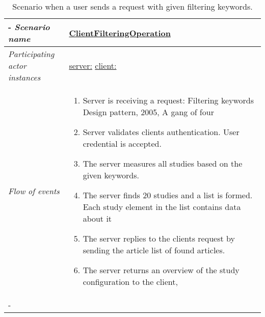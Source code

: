 %
%
\begin{table}[h!]
	\tabulinesep=1.5mm
	\begin{tabu} to 
		\tabucline[1.5pt]-
		\textit{Scenario name} & \underline{ClientFilteringOperation} \\
		\hline
		\textit{Participating actor 
		\newline instances} & \underline{server:\serverside}
		\newline \underline{client:\clientside} \\
		\hline
		\textit{Flow of events} &
		\vspace{-3mm}
		\begin{enumerate}[leftmargin=*,topsep=0pt,itemsep=-1ex]
			\item Server is receiving a request: Filtering keywords {Design pattern, 2005, A gang of four}
			
			\item Server validates clients authentication. User credential is accepted.
			
			\item The server measures all studies based on the given keywords.
			
			\item The server finds 20 studies and a list is formed. Each study element in the list contains data about it
			
			\item The server replies to the clients request by sending the article list of found articles.
			
			\item The server returns an overview of the study configuration to the client, 
		\end{enumerate} \\
		\tabucline[1.5pt]-
	\end{tabu}
		\caption{Scenario when a user sends a request with given filtering keywords.}
		\label{sc:ClientFilteringOperation}
\end{table}


